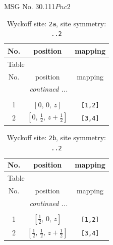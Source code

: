 \documentclass[fleqn,8pt]{jsarticle}
\begin{document}
\setcounter{MaxMatrixCols}{32}

\renewcommand{\tablename}{Table~}
\renewcommand{\figurename}{Figure~}
\begin{center}
\LARGE
MSG No. 30.111\quad$Pnc2$
\end{center}
\renewcommand{\arraystretch}{1.2}
\begin{longtable}{ccc}
\caption{Wyckoff site: {\tt 2a}, site symmetry: {\tt ..2}}
 \\
 \hline \hline
No. & position & mapping \\ \hline \endfirsthead

\multicolumn{2}{l}{\tablename\ \thetable{}} \\
 \hline \hline
No. & position & mapping \\ \hline \endhead

 \hline \hline
\multicolumn{2}{r}{\footnotesize\it continued ...} \\ \endfoot

 \hline \hline
\multicolumn{2}{r}{} \\ \endlastfoot

1 & $\left[ 0,\, 0,\, z \right]$ & {\tt [1,2]} \\ \hline
2 & $\left[ 0,\, \frac{1}{2},\, z + \frac{1}{2} \right]$ & {\tt [3,4]} \\
\end{longtable}
\renewcommand{\arraystretch}{1.2}
\begin{longtable}{ccc}
\caption{Wyckoff site: {\tt 2b}, site symmetry: {\tt ..2}}
 \\
 \hline \hline
No. & position & mapping \\ \hline \endfirsthead

\multicolumn{2}{l}{\tablename\ \thetable{}} \\
 \hline \hline
No. & position & mapping \\ \hline \endhead

 \hline \hline
\multicolumn{2}{r}{\footnotesize\it continued ...} \\ \endfoot

 \hline \hline
\multicolumn{2}{r}{} \\ \endlastfoot

1 & $\left[ \frac{1}{2},\, 0,\, z \right]$ & {\tt [1,2]} \\ \hline
2 & $\left[ \frac{1}{2},\, \frac{1}{2},\, z + \frac{1}{2} \right]$ & {\tt [3,4]} \\
\end{longtable}
\renewcommand{\arraystretch}{1.2}
\end{document}
